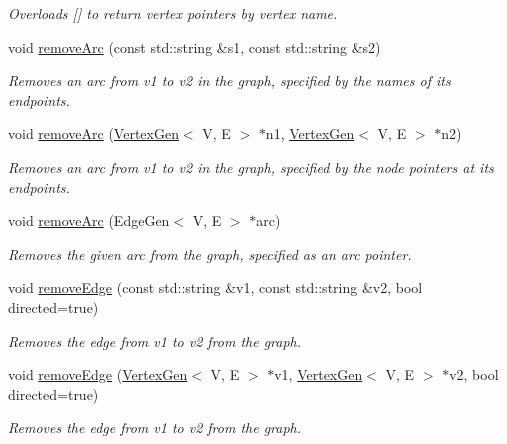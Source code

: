 \begin{DoxyCompactItemize}
\begin{DoxyCompactList}\small\item\em Overloads {\ttfamily \mbox{[}\mbox{]}} to return vertex pointers by vertex name. \end{DoxyCompactList}\item 
void \mbox{\hyperlink{classGraph_af6370fb52d2dab4eb7795da22c33dd02}{remove\+Arc}} (const std\+::string \&s1, const std\+::string \&s2)
\begin{DoxyCompactList}\small\item\em Removes an arc from v1 to v2 in the graph, specified by the names of its endpoints. \end{DoxyCompactList}\item 
void \mbox{\hyperlink{classGraph_ae0c9f44b20b49ffae9fecc0a4f156ac1}{remove\+Arc}} (\mbox{\hyperlink{classVertexGen}{Vertex\+Gen}}$<$ V, E $>$ $\ast$n1, \mbox{\hyperlink{classVertexGen}{Vertex\+Gen}}$<$ V, E $>$ $\ast$n2)
\begin{DoxyCompactList}\small\item\em Removes an arc from v1 to v2 in the graph, specified by the node pointers at its endpoints. \end{DoxyCompactList}\item 
void \mbox{\hyperlink{classGraph_a9d6580d1b0228fe6c1a02dfe70de1abf}{remove\+Arc}} (Edge\+Gen$<$ V, E $>$ $\ast$arc)
\begin{DoxyCompactList}\small\item\em Removes the given arc from the graph, specified as an arc pointer. \end{DoxyCompactList}\item 
void \mbox{\hyperlink{classBasicGraphGen_adfee7a20d0c13cc515b3b7e951d8baf2}{remove\+Edge}} (const std\+::string \&v1, const std\+::string \&v2, bool directed=true)
\begin{DoxyCompactList}\small\item\em Removes the edge from v1 to v2 from the graph. \end{DoxyCompactList}\item 
void \mbox{\hyperlink{classBasicGraphGen_a8b1003fbe63fab20173526459fff4139}{remove\+Edge}} (\mbox{\hyperlink{classVertexGen}{Vertex\+Gen}}$<$ V, E $>$ $\ast$v1, \mbox{\hyperlink{classVertexGen}{Vertex\+Gen}}$<$ V, E $>$ $\ast$v2, bool directed=true)
\begin{DoxyCompactList}\small\item\em Removes the edge from v1 to v2 from the graph. \end{DoxyCompactList}\item 

\end{DoxyCompactItemize}
